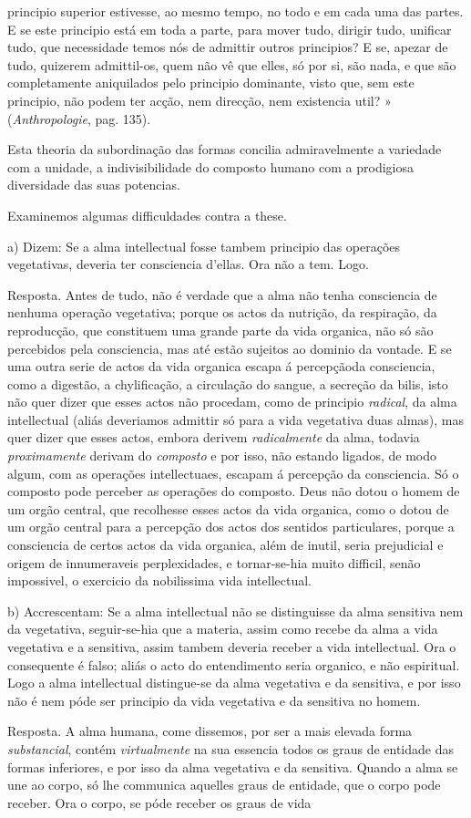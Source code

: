 principio superior estivesse, ao mesmo tempo, no todo e em cada uma das partes. E se este principio está em toda a parte, para mover tudo, dirigir tudo, unificar tudo, que necessidade temos nós de admittir outros principios? E se, apezar de tudo, quizerem admittil-os, quem não vê que elles, só por si, são nada, e que são completamente aniquilados pelo principio dominante, visto que, sem este principio, não podem ter acção, nem direcção, nem existencia util? » (\emph{Anthropologie}, pag. 135).\par Esta theoria da subordinação das formas concilia admiravelmente a variedade com a unidade, a indivisibilidade do composto humano com a prodigiosa diversidade das suas potencias.\par Examinemos algumas difficuldades contra a these.\par a) Dizem: Se a alma intellectual fosse tambem principio das operações vegetativas, deveria ter consciencia d'ellas. Ora não a tem. Logo.\par Resposta. Antes de tudo, não é verdade que a alma não tenha consciencia de nenhuma operação vegetativa; porque os actos da nutrição, da respiração, da reproducção, que constituem uma grande parte da vida organica, não só são percebidos pela consciencia, mas até estão sujeitos ao dominio da vontade. E se uma outra serie de actos da vida organica escapa á percepçãoda consciencia, como a digestão, a chylificação, a circulação do sangue, a secreção da bilis, isto não quer dizer que esses actos não procedam, como de principio \emph{radical}, da alma intellectual (aliás deveriamos admittir só para a vida vegetativa duas almas), mas quer dizer que esses actos, embora derivem \emph{radicalmente} da alma, todavia \emph{proximamente} derivam do \emph{composto} e por isso, não estando ligados, de modo algum, com as operações intellectuaes, escapam á percepção da consciencia. Só o composto pode perceber as operações do composto. Deus não dotou o homem de um orgão central, que recolhesse esses actos da vida organica, como o dotou de um orgão central para a percepção dos actos dos sentidos particulares, porque a consciencia de certos actos da vida organica, além de inutil, seria prejudicial e origem de innumeraveis perplexidades, e tornar-se-hia muito difficil, senão impossivel, o exercicio da nobilissima vida intellectual.\par b) Accrescentam: Se a alma intellectual não se distinguisse da alma sensitiva nem da vegetativa, seguir-se-hia que a materia, assim como recebe da alma a vida vegetativa e a sensitiva, assim tambem deveria receber a vida intellectual. Ora o consequente é falso; aliás o acto do entendimento seria organico, e não espiritual. Logo a alma intellectual distingue-se da alma vegetativa e da sensitiva, e por isso não é nem póde ser principio da vida vegetativa e da sensitiva no homem.\par Resposta. A alma humana, come dissemos, por ser a mais elevada forma \emph{substancial}, contém \emph{virtualmente} na sua essencia todos os graus de entidade das formas inferiores, e por isso da alma vegetativa e da sensitiva. Quando a alma se une ao corpo, só lhe communica aquelles graus de entidade, que o corpo pode receber. Ora o corpo, se póde receber os graus de vida 